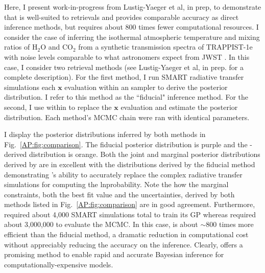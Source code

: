 Here, I present work-in-progress from Lustig-Yaeger et al, in prep, to demonstrate that \approxposterior is well-suited to retrievals and provides comparable accuracy as direct inference methods, but requires about 800 times fewer computational resources. I consider the case of inferring the isothermal atmospheric temperature and mixing ratios of H$_2$O and CO$_2$ from a synthetic transmission spectra of TRAPPIST-1e with noise levels comparable to what astronomers expect from JWST \citep{Lincowski2018}. In this case, I consider two retrieval methods (see Lustig-Yaeger et al, in prep. for a complete description). For the first method, I run SMART radiative transfer simulations each $\textbf{x}$ evaluation within an \emcee sampler to derive the posterior distribution. I refer to this method as the ``fiducial" inference method. For the second, I use \approxposterior within \emcee to replace the $\textbf{x}$ evaluation and estimate the posterior distribution. Each method's MCMC chain were ran with identical parameters. 

I display the posterior distributions inferred by both methods in Fig.~\ref{AP:fig:comparison}. The fiducial posterior distribution is purple and the \approxposterior-derived distribution is orange. Both the joint and marginal posterior distributions derived by \approxposterior are in excellent with the distributions derived by the fiducial method demonstrating \approxposterior's ability to accurately replace the complex radiative transfer simulations for computing the lnprobability. Note the how the marginal constraints, both the best fit value and the uncertainties, derived by both methods listed in Fig.~\ref{AP:fig:comparison} are in good agreement. Furthermore, \approxposterior required about 4,000 SMART simulations total to train its GP whereas \emcee required about 3,000,000 to evaluate the MCMC. In this case, \approxposterior is about ${\sim}800$ times more efficient than the fiducial method, a dramatic reduction in computational cost without appreciably reducing the accuracy on the inference. Clearly, \approxposterior offers a promising method to enable rapid and accurate Bayesian inference for computationally-expensive models.

